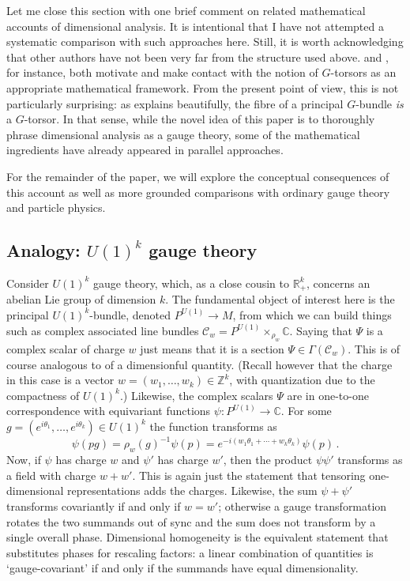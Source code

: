 \documentclass[12pt]{article}
\numberwithin{equation}{section}
\newcommand{\R}{\mathbb{R}}
\newcommand{\Z}{\mathbb{Z}}
\newcommand{\C}{\mathbb{C}}
\begin{document}
Let me close this section with one brief comment on related mathematical accounts of dimensional analysis. It is intentional that I have not attempted a systematic comparison with such approaches here. Still, it is worth acknowledging that other authors have not been very far from the structure used above. \citet{Tao2012} and \citet{Domotor2017}, for instance, both motivate and make contact with the notion of $G$-torsors as an appropriate mathematical framework. From the present point of view, this is not particularly surprising: as \citet{Baez2009} explains beautifully, the fibre of a principal $G$-bundle \emph{is} a $G$-torsor. In that sense, while the novel idea of this paper is to thoroughly phrase dimensional analysis as a gauge theory, some of the mathematical ingredients have already appeared in parallel approaches.

For the remainder of the paper, we will explore the conceptual consequences of this account as well as more grounded comparisons with ordinary gauge theory and particle physics.

\subsection{Analogy: $U(1)^k$ gauge theory}\label{sec:U(1)}
Consider $U(1)^k$ gauge theory, which, as a close cousin to $\R_+^k$, concerns an abelian Lie group of dimension $k$. The fundamental object of interest here is the principal $U(1)^k$-bundle, denoted $P^{U(1)}\to M$, from which we can build things such as complex associated line bundles $\mathcal{C}_w=P^{U(1)}\times_{\rho_w} \C$. Saying that $\Psi$ is a complex scalar of charge $w$ just means that it is a section $\Psi\in \Gamma(\mathcal{C}_w)$. This is of course analogous to  of a dimensionful quantity. (Recall however that the charge in this case is a vector $w=(w_1,\dots,w_k)\in \Z^k$, with quantization due to the compactness of $U(1)^k$.) Likewise, the complex scalars $\Psi$ are in one-to-one correspondence with equivariant functions $\psi\colon P^{U(1)}\to \C$. For some $g = (e^{i\theta_1},\dots, e^{i\theta_k}) \in U(1)^k$ the function transforms as
\begin{equation}
    \psi(pg)= \rho_w(g)^{-1}\psi(p) = e^{-i(w_1\theta_1+\cdots + w_k\theta_k)}\psi(p)\,.
\end{equation}
Now, if $\psi$ has charge $w$ and $\psi'$ has charge $w'$, then the product $\psi\psi'$ transforms as a field with charge $w+w'$. This is again just the statement that tensoring one-dimensional representations adds the charges. Likewise, the sum $\psi+\psi'$ transforms covariantly if and only if $w=w'$; otherwise a gauge transformation rotates the two summands out of sync and the sum does not transform by a single overall phase. Dimensional homogeneity is the equivalent statement that substitutes phases for rescaling factors: a linear combination of quantities is `gauge-covariant' if and only if the summands have equal dimensionality.
\end{document}
